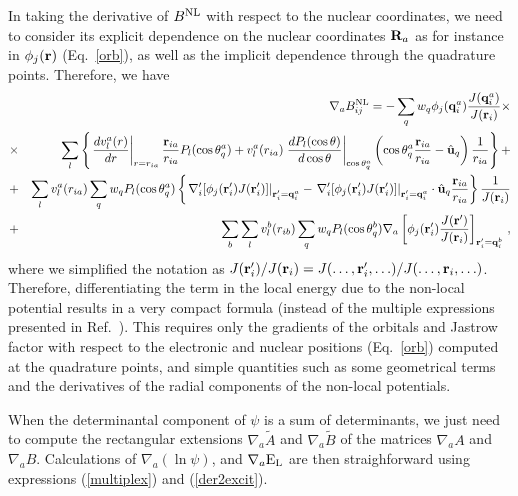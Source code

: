 \documentclass[aip,jcp,reprint,floatfix,onecolumn]{revtex4-1}
\begin{document}
In taking the derivative of $B^{\rm NL}$ with respect to the nuclear coordinates, we need to consider its explicit dependence on the nuclear coordinates ${\bf R}_a$ as for instance in $\phi_j({\bf r})$ (Eq.~\ref{orb}), as well as the implicit dependence through the quadrature points. Therefore, we have
\begin{eqnarray}
&&\nabla_a B^{\rm NL}_{ij}=-\sum_q  w_{q} \phi_j({\bf q}^a_i) \frac{J({\bf q}^a_i)}{J({\bf r}_i)} \times\nonumber\\
&\times&\sum_l \left\{\left.\frac{d v_l^a(r)}{d r}\right|_{r=r_{ia}} \frac{{\bf r}_{ia}}{r_{ia}} P_l(\cos\theta_q^a)
+v_l^a(r_{ia})\left.\frac{dP_l(\cos\theta)}{d\cos\theta}\right|_{\cos\theta_q^a}
\left(\cos\theta_q^a\frac{{\bf r}_{ia}}{r_{ia}}-\hat{\bf u}_q\right)\frac{1}{r_{ia}} \right\}+\nonumber\\
&+&\sum_l v_l^a(r_{ia}) \sum_q w_q
P_l(\cos\theta_q^a)\left\{\left.{\nabla_i^\prime [\phi_j({\bf r}^\prime_i)J({\bf r}_i^\prime)]}\right|_{{\bf r}_i^\prime={\bf q}^a_i}
-\left.\nabla_i^\prime [\phi_j({\bf r}_i^\prime)J({\bf r}_i^\prime)]\right|_{{\bf r}_i^\prime={\bf q}^a_i}\cdot \hat{\bf u}_q \frac{{\bf r}_{ia}}{r_{ia}}\right\}\frac{1}{J({\bf r}_i)}\nonumber\\
                  &+&\sum_b\sum_l v_l^b(r_{ib})
\sum_{q} w_{q}P_l(\cos\theta_q^b)\nabla_a\left[\phi_j({\bf r}^\prime_i) \frac{J({\bf r}^\prime)}{J({\bf r}_i)}\right]_{{\bf r}_i^\prime={\bf q}^b_i}\,,
\label{grad_a_BNL}
\end{eqnarray}
where we simplified the notation as ${J({\bf r}^\prime_i)}/{J({\bf r}_i)}={J(\ldots,{\bf r}_i^\prime,\ldots)}/{J(\ldots,{\bf r}_i,\ldots)}$. Therefore, differentiating the term in the local energy  due to the non-local potential results in a very compact formula (instead of the multiple expressions presented in Ref.~). This requires only the gradients of the orbitals and Jastrow factor with respect to the electronic and nuclear positions (Eq.~\ref{orb}) computed at the quadrature points, and simple quantities such as some geometrical terms and the derivatives of the radial components of the non-local potentials.

When the determinantal component of $\psi$ is a sum of determinants, we just need to compute the rectangular extensions
$\nabla_a \tilde{A}$ and $\nabla_a \tilde{B}$ of the matrices $\nabla_a {A}$ and $\nabla_a {B}$.
Calculations of $\nabla_a (\ln \psi)$, and $\nabla_a {\rm E}_{\rm L}$  are then straighforward using expressions (\ref{multiplex}) and (\ref{der2excit}).
\end{document}
